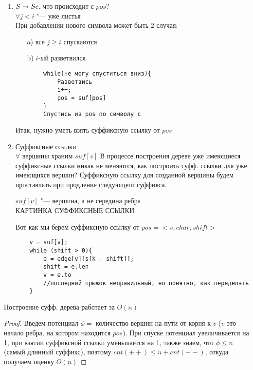 \begin{enumerate}
\begin{proof}
		КАРТИНКА ДОКАЗАТЕЛЬСТВА ЛЕММЫ
	\end{proof}
	Таким образом, надо поддерживать самый длинный неразретвившийся суффикс, будем хранить его в переменной $pos$, как комбинацию вершины дерева, символа по которому надо пойти и сдвига на ребре ($pos$ может быть на середине ребра), $i$ "--- позиция начала суффикса
\item
	$ S \rightarrow Sc $, что происходит с $pos$? \\
	$\forall j < i$ "--- уже листья \\
	При добавлении нового символа может быть 2 случая:
	\begin{itemize}
	\item[a)]
		все $j \geqslant i$ спускаются
	\item[b)]
		$i$-ый разветвился
	\end{itemize}
	\begin{verbatim}
		while(не могу спуститься вниз){
			Разветвись
			i++;
			pos = suf[pos]
		}
		Спустись из pos по символу c
	\end{verbatim}
	Итак, нужно уметь взять суффиксную ссылку от $pos$
\item
	Суффиксные ссылки \\
	$\forall$ вершины храним $suf[v]$
	В процессе построения дереве уже имеющиеся суффиксные ссылки никак не меняются, как построить суфф. ссылки для уже имеющихся вершин? Суффиксную ссылку для созданной вершины будем проставлять при продление следующего суффикса.
	\begin{lemma}
		$suf[v]$ "--- вершина, а не середина ребра \\
		КАРТИНКА СУФФИКСНЫЕ ССЫЛКИ
	\end{lemma}
	Вот как мы берем суффиксную ссылку от $pos = < v, char, shift >$
	\begin{verbatim}
	v = suf[v];
	while (shift > 0){
		e = edge[v][s[k - shift]];
		shift = e.len
		v = e.to
		//последний прыжок неправильный, но понятно, как переделать
	}
	\end{verbatim}
\end{enumerate}

\begin{theorem}
	Построение суфф. дерева работает за $O(n)$
\end{theorem}
\begin{proof}
	Введем потенциал $\phi =$ количество вершин на пути от корня к $v$ ($v$ это начало ребра, на котором находится $pos$). При спуске потенциал увеличивается на 1, при взятии суффиксной ссылки уменьшается на 1, также знаем, что $\phi \leqslant n$ (самый длинный суффикс), поэтому $cnt(++) \leqslant n + cnt(--)$, откуда получаем оценку $O(n)$
\end{proof}

